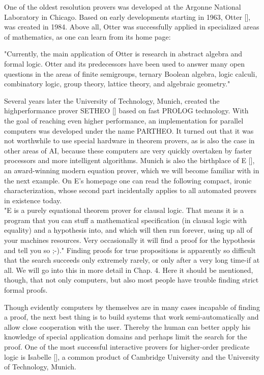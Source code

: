 \documentclass[10pt]{book}
\begin{document}
One of the oldest resolution provers was developed at the Argonne National Laboratory in Chicago. Based on early developments starting in 1963, Otter [\cite{kal01}], was created in 1984. Above all, Otter was successfully applied in specialized areas of mathematics, as one can learn from its home page:

\begin{displayquote}
"Currently, the main application of Otter is research in abstract algebra and formal logic. Otter and its predecessors have been used to answer many open questions in the areas of finite semigroups, ternary Boolean algebra, logic calculi, combinatory logic, group theory, lattice theory, and algebraic geometry."
\end{displayquote}

Several years later the University of Technology, Munich, created the highperformance prover SETHEO [\cite{lsbb92}] based on fast PROLOG technology. With the goal of reaching even higher performance, an implementation for parallel computers was developed under the name PARTHEO. It turned out that it was not worthwhile to use special hardware in theorem provers, as is also the case in other areas of AI, because these computers are very quickly overtaken by faster processors and more intelligent algorithms. Munich is also the birthplace of E [\cite{sch02}], an award-winning modern equation prover, which we will become familiar with in the next example. On E's homepage one can read the following compact, ironic characterization, whose second part incidentally applies to all automated provers in existence today.\\
"E is a purely equational theorem prover for clausal logic. That means it is a program that you can stuff a mathematical specification (in clausal logic with equality) and a hypothesis into, and which will then run forever, using up all of your machines resources. Very occasionally it will find a proof for the hypothesis and tell you so ;-)."
Finding proofs for true propositions is apparently so difficult that the search succeeds only extremely rarely, or only after a very long time-if at all. We will go into this in more detail in Chap. 4. Here it should be mentioned, though, that not only computers, but also most people have trouble finding strict formal proofs.

Though evidently computers by themselves are in many cases incapable of finding a proof, the next best thing is to build systems that work semi-automatically and allow close cooperation with the user. Thereby the human can better apply his knowledge of special application domains and perhaps limit the search for the proof. One of the most successful interactive provers for higher-order predicate logic is Isabelle [\cite{npw02}], a common product of Cambridge University and the University of Technology, Munich.
\end{document}
